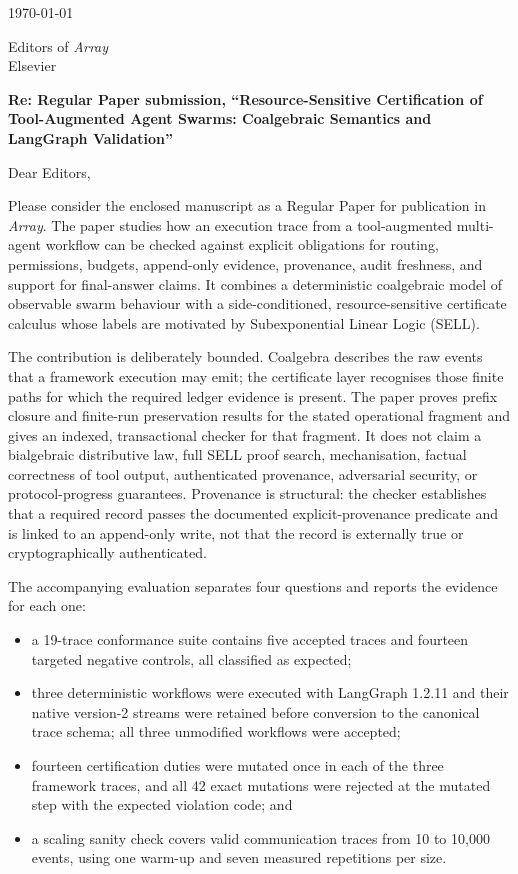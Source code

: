 \documentclass[11pt]{article}
\begin{document}
\begin{flushright}
\today
\end{flushright}

Editors of \emph{Array}\\
Elsevier

\textbf{Re: Regular Paper submission, ``Resource-Sensitive Certification of
Tool-Augmented Agent Swarms: Coalgebraic Semantics and LangGraph Validation''}

Dear Editors,

Please consider the enclosed manuscript as a Regular Paper for publication in
\emph{Array}. The paper studies how an execution trace from a tool-augmented
multi-agent workflow can be checked against explicit obligations for routing,
permissions, budgets, append-only evidence, provenance, audit freshness, and
support for final-answer claims. It combines a deterministic coalgebraic model
of observable swarm behaviour with a side-conditioned, resource-sensitive
certificate calculus whose labels are motivated by Subexponential Linear Logic
(SELL).

The contribution is deliberately bounded. Coalgebra describes the raw events
that a framework execution may emit; the certificate layer recognises those
finite paths for which the required ledger evidence is present. The paper proves
prefix closure and finite-run preservation results for the stated operational
fragment and gives an indexed, transactional checker for that fragment. It does
not claim a bialgebraic distributive law, full SELL proof search, mechanisation,
factual correctness of tool output, authenticated provenance, adversarial
security, or protocol-progress guarantees. Provenance is structural: the
checker establishes that a required record passes the documented
explicit-provenance predicate and is linked to an append-only write, not that
the record is externally true or cryptographically authenticated.

The accompanying evaluation separates four questions and reports the evidence
for each one:

\begin{itemize}
  \item a 19-trace conformance suite contains five accepted traces and fourteen
        targeted negative controls, all classified as expected;
  \item three deterministic workflows were executed with LangGraph 1.2.11 and
        their native version-2 streams were retained before conversion to the
        canonical trace schema; all three unmodified workflows were accepted;
  \item fourteen certification duties were mutated once in each of the three
        framework traces, and all 42 exact mutations were rejected at the
        mutated step with the expected violation code; and
  \item a scaling sanity check covers valid communication traces from 10 to
        10,000 events, using one warm-up and seven measured repetitions per
        size.
\end{itemize}
\end{document}
